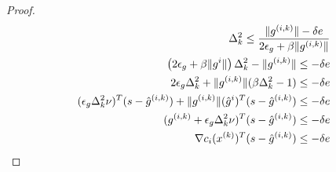 \begin{proof}

\begin{align*}
\Delta_k^2 \le \frac{\|{g^{(i, k)}}\| -\delta e } {2\epsilon_{g} + \beta \|{g^{(i, k)}}\|} \\
\left(2\epsilon_{g} + \beta \|g^i\|\right)\Delta_k^2 - \|{g^{(i, k)}}\|\le -\delta e \\
2\epsilon_{g}\Delta_k^2 + \|{g^{(i, k)}}\|(\beta \Delta_k^2 - 1)\le -\delta e \\
(\epsilon_{g}\Delta_k^2\nu)^T (s - {{\hat g}^{(i, k)}}) + \|{g^{(i, k)}}\|({\hat g}^i)^T(s - {{\hat g}^{(i, k)}})\le -\delta e \\
({g^{(i, k)}} + \epsilon_{g}\Delta_k^2\nu)^T (s - {{\hat g}^{(i, k)}}) \le -\delta e \\
\nabla c_i({x^{(k)}})^T (s - {{\hat g}^{(i, k)}}) \le -\delta e
\end{align*}


\end{proof}
